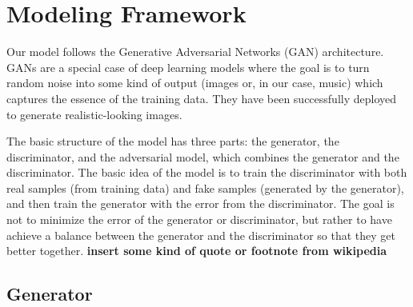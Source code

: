\documentclass[12pt,oneside]{chicagocapstone}
\begin{document}
\hypertarget{methodology-modeling}{%
\section*{Modeling Framework}\label{methodology-modeling}}

Our model follows the Generative Adversarial Networks (GAN) architecture. GANs are a special case of deep learning models where the goal is to turn random noise into some kind of output (images or, in our case, music) which captures the essence of the training data. They have been successfully deployed to generate realistic-looking images.

The basic structure of the model has three parts: the generator, the discriminator, and the adversarial model, which combines the generator and the discriminator. The basic idea of the model is to train the discriminator with both real samples (from training data) and fake samples (generated by the generator), and then train the generator with the error from the discriminator. The goal is not to minimize the error of the generator or discriminator, but rather to have achieve a balance between the generator and the discriminator so that they get better together. \textbf{insert some kind of quote or footnote from wikipedia}

\hypertarget{generator}{%
\subsection*{Generator}\label{generator}}
\end{document}
